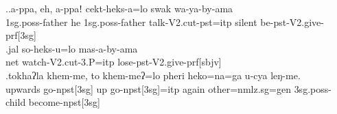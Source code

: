 \ex.\ag.a-ppa,             eh,  a-ppaǃ             cekt-heks-a=lo                   swak  wa-ya-by-ama\\
{\sc 1sg.poss-}father he {\sc 1sg.poss-}father talk{\sc -V2.cut-pst=itp} silent be{\sc -pst-V2.give-prf[3sg]}\\
 
\bg.jal so-heks-u=lo                  mas-a-by-ama\\
net watch{\sc -V2.cut-3.P=itp} lose{\sc -pst-V2.give-prf[sbjv]}\\
 
\bg.tokhaʔla khem-me,             to  khem-meʔ=lo           pheri heko=na=ga            u-cya            leŋ-me.\\
upwards go{\sc -npst[3sg]} up go{\sc -npst[3sg]=itp} again other{\sc =nmlz.sg=gen} {\sc 3sg.poss-}child become{\sc -npst[3sg]}\\
 
	
	